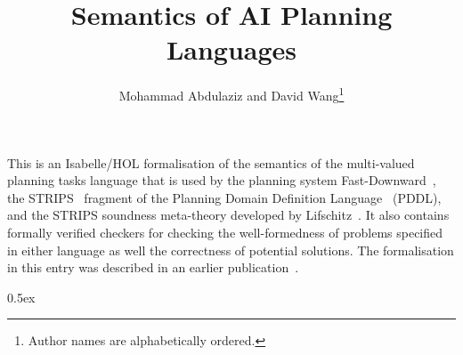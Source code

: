 \documentclass[11pt,a4paper]{article}
\begin{document}
\title{Semantics of AI Planning Languages}
\author{Mohammad Abdulaziz and David Wang\footnote{Author names are alphabetically ordered.}}

\date{}

\maketitle

This is an Isabelle/HOL formalisation of the semantics of the multi-valued planning tasks language that is used by the planning system Fast-Downward~\cite{helmert2006fast}, the STRIPS~\cite{fikes1971strips} fragment of the Planning Domain Definition Language~\cite{PDDLref} (PDDL), and the STRIPS soundness meta-theory developed by Lifschitz~\cite{lifschitz1987semantics}.
It also contains formally verified checkers for checking the well-formedness of problems specified in either language as well the correctness of potential solutions.
The formalisation in this entry was described in an earlier publication~\cite{ictai2018}.

\tableofcontents

\clearpage

\parindent 0pt\parskip 0.5ex





\end{document}
